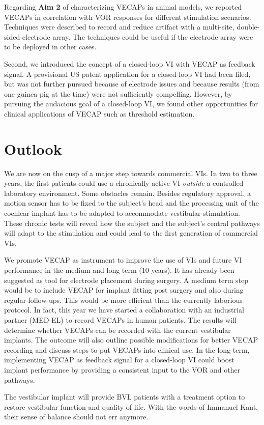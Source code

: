 Regarding \textbf{Aim 2} of characterizing VECAPs in animal models, we reported VECAPs in correlation with VOR responses for different stimulation scenarios. Techniques were described to record and reduce artifact with a multi-site, double-sided electrode array. The techniques could be useful if the electrode array were to be deployed in other cases. 

Second, we introduced the concept of a closed-loop VI with VECAP as feedback signal. A provisional US patent application for a closed-loop VI had been filed, but was not further pursued because of electrode issues and because results (from one guinea pig at the time) were not sufficiently compelling. However, by pursuing the audacious goal of a closed-loop VI, we found other opportunities for clinical applications of VECAP such as threshold estimation.

\section*{Outlook}
We are now on the cusp of a major step towards commercial VIs. In two to three years, the first patients could use a chronically active VI \emph{outside} a controlled laboratory environment. Some obstacles remain. Besides regulatory approval, a motion sensor has to be fixed to the subject's head and the processing unit of the cochlear implant has to be adapted to accommodate vestibular stimulation. These chronic tests will reveal how the subject and the subject's central pathways will adapt to the stimulation and could lead to the first generation of commercial VIs.

We promote VECAP as instrument to improve the use of VIs and future VI performance in the medium and long term (10 years). It has already been suggested as tool for electrode placement during surgery. A medium term step would be to include VECAP for implant fitting post surgery and also during regular follow-ups. This would be more efficient than the currently laborious protocol. In fact, this year we have started a collaboration with an industrial partner (MED-EL) to record VECAPs in human patients. The results will determine whether VECAPs can be recorded with the current vestibular implants. The outcome will also outline possible modifications for better VECAP recording and discuss steps to put VECAPs into clinical use. In the long term, implementing VECAP as feedback signal for a closed-loop VI could boost implant performance by providing a consistent input to the VOR and other pathways. 

The vestibular implant will provide BVL patients with a treatment option to restore vestibular function and quality of life. With the words of Immanuel Kant, their sense of balance should not err anymore.


